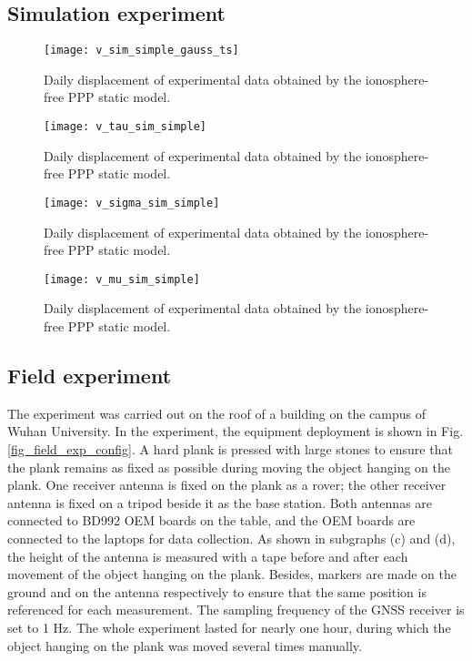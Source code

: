 \documentclass{svjour3}                     %
\begin{document}
\subsection{Simulation experiment}
\begin{figure}[H]
	\centering
	\texttt{[image: v\_sim\_simple\_gauss\_ts]}
	\caption{Daily displacement of experimental data obtained by the ionosphere-free PPP static model.}
	\label{fig_v_sim_simple_gauss_ts}
\end{figure} 

\begin{figure}[H]
	\centering
	\texttt{[image: v\_tau\_sim\_simple]}
	\caption{Daily displacement of experimental data obtained by the ionosphere-free PPP static model.}
	\label{fig_v_tau_sim_simple}
\end{figure} 

\begin{figure}[H]
	\centering
	\texttt{[image: v\_sigma\_sim\_simple]}
	\caption{Daily displacement of experimental data obtained by the ionosphere-free PPP static model.}
	\label{fig_v_sigma_sim_simple}
\end{figure} 

\begin{figure}[H]
	\centering
	\texttt{[image: v\_mu\_sim\_simple]}
	\caption{Daily displacement of experimental data obtained by the ionosphere-free PPP static model.}
	\label{fig_v_mu_sim_simple}
\end{figure} 

\subsection{Field experiment}
The experiment was carried out on the roof of a building on the campus of Wuhan University. In the experiment, the equipment deployment is shown in Fig. \ref{fig_field_exp_config}. A hard plank is pressed with large stones to ensure that the plank remains as fixed as possible during moving the object hanging on the plank. One receiver antenna is fixed on the plank as a rover; the other receiver antenna is fixed on a tripod beside it as the base station. Both antennas are connected to BD992 OEM boards on the table, and the OEM boards are connected to the laptops for data collection. As shown in subgraphs (c) and (d), the height of the antenna is measured with a tape before and after each movement of the object hanging on the plank. Besides, markers are made on the ground and on the antenna respectively to ensure that the same position is referenced for each measurement. The sampling frequency of the GNSS receiver is set to 1 Hz. The whole experiment lasted for nearly one hour, during which the object hanging on the plank was moved several times manually.
\end{document}
